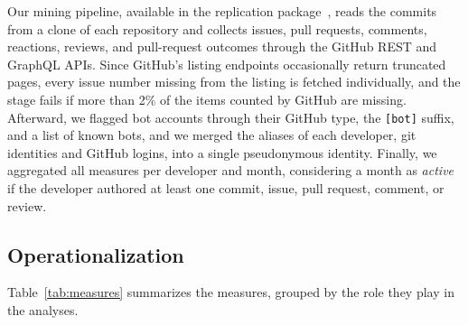 Our mining pipeline, available in the replication package~\cite{replication}, reads the commits from a clone of each repository and collects issues, pull requests, comments, reactions, reviews, and pull-request outcomes through the GitHub REST and GraphQL APIs. Since GitHub's listing endpoints occasionally return truncated pages, every issue number missing from the listing is fetched individually, and the stage fails if more than 2\% of the items counted by GitHub are missing. Afterward, we flagged bot accounts through their GitHub type, the \texttt{[bot]} suffix, and a list of known bots, and we merged the aliases of each developer, \ie git identities and GitHub logins, into a single pseudonymous identity. Finally, we aggregated all measures per developer and month, considering a month as \textit{active} if the developer authored at least one commit, issue, pull request, comment, or review.

\subsection{Operationalization}
\label{subsec:measures}

Table~\ref{tab:measures} summarizes the measures, grouped by the role they play in the analyses.

